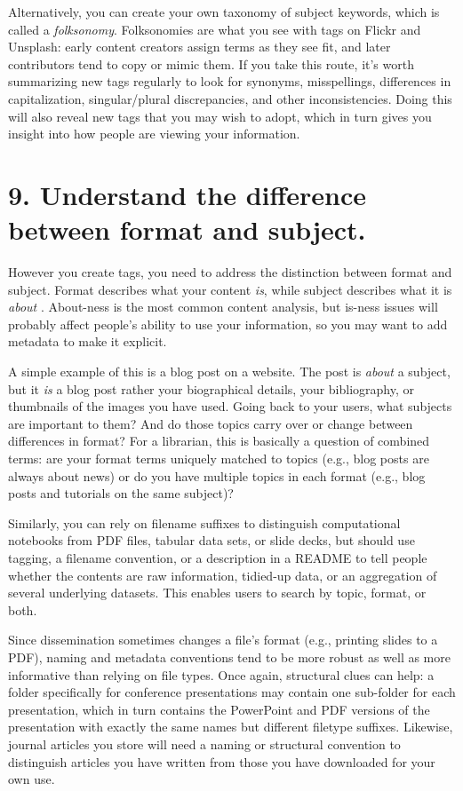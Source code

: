 \documentclass[10pt,letterpaper]{article}
\newcommand{\rulemajor}[1]{\section*{#1}}
\begin{document}
Alternatively, you can create your own taxonomy of subject keywords, which is
called a \emph{folksonomy}. Folksonomies are what you see with tags on Flickr
and Unsplash: early content creators assign terms as they see fit, and later
contributors tend to copy or mimic them. If you take this route, it's worth
summarizing new tags regularly to look for synonyms, misspellings, differences
in capitalization, singular/plural discrepancies, and other inconsistencies.
Doing this will also reveal new tags that you may wish to adopt, which in turn
gives you insight into how people are viewing your information.

\rulemajor{9. Understand the difference between format and subject.}

However you create tags, you need to address the distinction between format and
subject. Format describes what your content \emph{is}, while subject describes
what it is \emph{about} \cite{Joudrey2015}. About-ness is the most common
content analysis, but is-ness issues will probably affect people's ability to
use your information, so you may want to add metadata to make it explicit.

A simple example of this is a blog post on a website. The post is \emph{about} a
subject, but it \emph{is} a blog post rather your biographical details, your
bibliography, or thumbnails of the images you have used.  Going back to your
users, what subjects are important to them? And do those topics carry over or
change between differences in format? For a librarian, this is basically a
question of combined terms: are your format terms uniquely matched to topics
(e.g., blog posts are always about news) or do you have multiple topics in each
format (e.g., blog posts and tutorials on the same subject)?

Similarly, you can rely on filename suffixes to distinguish computational
notebooks from PDF files, tabular data sets, or slide decks, but should use
tagging, a filename convention, or a description in a README to tell people
whether the contents are raw information, tidied-up data, or an aggregation of
several underlying datasets. This enables users to search by topic, format, or
both.

Since dissemination sometimes changes a file's format (e.g., printing slides to
a PDF), naming and metadata conventions tend to be more robust as well as more
informative than relying on file types. Once again, structural clues can help: a
folder specifically for conference presentations may contain one sub-folder for
each presentation, which in turn contains the PowerPoint and PDF versions of the
presentation with exactly the same names but different filetype suffixes.
Likewise, journal articles you store will need a naming or structural convention
to distinguish articles you have written from those you have downloaded for your
own use.
\end{document}
